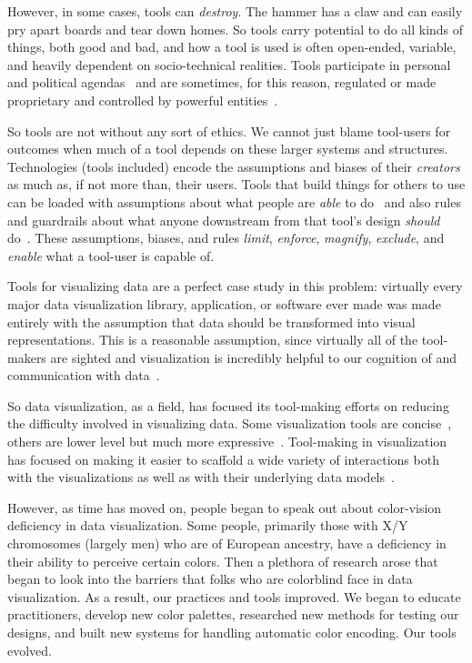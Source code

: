 \documentclass[12pt]{cmuthesis}
\begin{document}
However, in some cases, tools can \textit{destroy}. The hammer has a claw and can easily pry apart boards and tear down homes. So tools carry potential to do all kinds of things, both good and bad, and how a tool is used is often open-ended, variable, and heavily dependent on socio-technical realities. Tools participate in personal and political agendas~\cite{Winner2017} and are sometimes, for this reason, regulated or made proprietary and controlled by powerful entities~\cite{Widder2024, Widder2023}.

So tools are not without any sort of ethics. We cannot just blame tool-users for outcomes when much of a tool depends on these larger systems and structures. Technologies (tools included) encode the assumptions and biases of their \textit{creators} as much as, if not more than, their users. Tools that build things for others to use can be loaded with assumptions about what people are \textit{able} to do~\cite{Wobbrock2011Ability} and also rules and guardrails about what anyone downstream from that tool's design \textit{should} do~\cite{Widder2023, WidderUpstream2023}. These assumptions, biases, and rules \textit{limit}, \textit{enforce}, \textit{magnify}, \textit{exclude}, and \textit{enable} what a tool-user is capable of.

Tools for visualizing data are a perfect case study in this problem: virtually every major data visualization library, application, or software ever made was made entirely with the assumption that data should be transformed into visual representations. This is a reasonable assumption, since virtually all of the tool-makers are sighted and visualization is incredibly helpful to our cognition of and communication with data~\cite{Franconeri2021}.

So data visualization, as a field, has focused its tool-making efforts on reducing the difficulty involved in visualizing data. Some visualization tools are concise~\cite{Satyanarayan2017VegaLite}, others are lower level but much more expressive~\cite{Bostock2011D3}. Tool-making in visualization has focused on making it easier to scaffold a wide variety of interactions both with the visualizations as well as with their underlying data models~\cite{heer_mosaic_2023}. 

However, as time has moved on, people began to speak out about color-vision deficiency in data visualization. Some people, primarily those with X/Y chromosomes (largely men) who are of European ancestry, have a deficiency in their ability to perceive certain colors. Then a plethora of research arose that began to look into the barriers that folks who are colorblind face in data visualization. As a result, our practices and tools improved. We began to educate practitioners, develop new color palettes, researched new methods for testing our designs, and built new systems for handling automatic color encoding. Our tools evolved.
\end{document}
